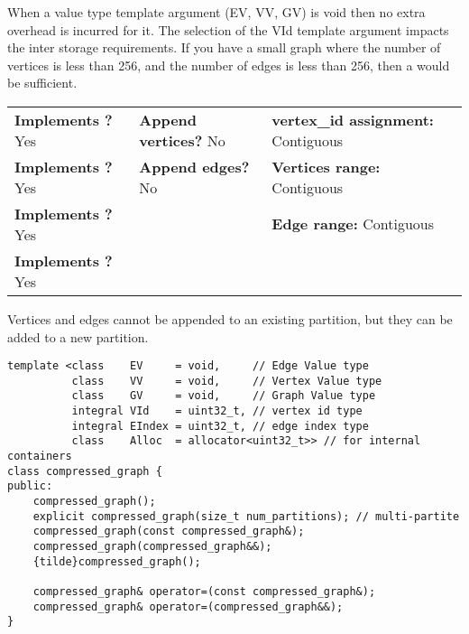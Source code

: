 When a value type template argument (EV, VV, GV) is void then no extra overhead is incurred for it. 
The selection of the VId template argument impacts the inter storage requirements. If you have a small 
graph where the number of vertices is less than 256, and the number of edges is less than 256, 
then a  would be sufficient.

\begin{table}[h]
    \setcellgapes{3pt}
    \makegapedcells
    \centering
    \begin{tabular}{|P{0.37\textwidth}|P{0.25\textwidth}|P{0.38\textwidth}|}
    \hline
    \textbf{Implements ?} Yes & \textbf{Append vertices?} No & \textbf{vertex\_id assignment:} Contiguous\\
    \textbf{Implements ?} Yes & \textbf{Append edges?} No & \textbf{Vertices range:} Contiguous \\
    \textbf{Implements ?} Yes &  & \textbf{Edge range:} Contiguous \\
    \textbf{Implements ?} Yes &  & \\
    \hline
    \end{tabular}
    \label{tab:compressed_graph_summary}
\end{table}
Vertices and edges cannot be appended to an existing partition, but they can be added to a new partition.

\begin{lstlisting}
template <class    EV     = void,     // Edge Value type
          class    VV     = void,     // Vertex Value type
          class    GV     = void,     // Graph Value type
          integral VId    = uint32_t, // vertex id type
          integral EIndex = uint32_t, // edge index type
          class    Alloc  = allocator<uint32_t>> // for internal containers
class compressed_graph {
public:
    compressed_graph();
    explicit compressed_graph(size_t num_partitions); // multi-partite
    compressed_graph(const compressed_graph&);
    compressed_graph(compressed_graph&&);
    {tilde}compressed_graph();

    compressed_graph& operator=(const compressed_graph&);
    compressed_graph& operator=(compressed_graph&&);
}
\end{lstlisting}





